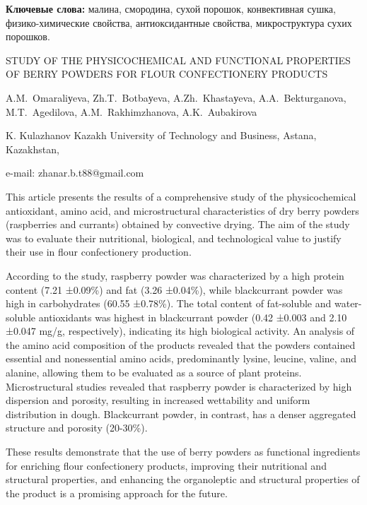 {\bfseries Ключевые слова:} малина, смородина, сухой порошок, конвективная
сушка, физико-химические свойства, антиоксидантные свойства,
микроструктура сухих порошков.
\vspace{1em}
\begin{header}
STUDY OF THE PHYSICOCHEMICAL AND FUNCTIONAL PROPERTIES OF BERRY POWDERS FOR FLOUR CONFECTIONERY PRODUCTS

A.M.~Omaraliуeva,
Zh.T.~Botbaуeva\envelope,
A.Zh.~Khastaуeva,
A.A.~Bekturganova,
M.T.~Agedilova,
A.M.~Rakhimzhanova,
A.K.~Aubakirova
\end{header}

\begin{affil}
K. Kulazhanov Kazakh University of Technology and Business, Astana, Kazakhstan,

e-mail: zhanar.b.t88@gmail.com
\end{affil}

This article presents the results of a comprehensive study of the
physicochemical antioxidant, amino acid, and microstructural
characteristics of dry berry powders (raspberries and currants) obtained
by convective drying. The aim of the study was to evaluate their
nutritional, biological, and technological value to justify their use in
flour confectionery production.

According to the study, raspberry powder was characterized by a high
protein content (7.21 ±0.09\%) and fat (3.26 ±0.04\%), while
blackcurrant powder was high in carbohydrates (60.55 ±0.78\%). The total
content of fat-soluble and water-soluble antioxidants was highest in
blackcurrant powder (0.42 ±0.003 and 2.10 ±0.047 mg/g, respectively),
indicating its high biological activity. An analysis of the amino acid
composition of the products revealed that the powders contained
essential and nonessential amino acids, predominantly lysine, leucine,
valine, and alanine, allowing them to be evaluated as a source of plant
proteins. Microstructural studies revealed that raspberry powder is
characterized by high dispersion and porosity, resulting in increased
wettability and uniform distribution in dough. Blackcurrant powder, in
contrast, has a denser aggregated structure and porosity (20-30\%).

These results demonstrate that the use of berry powders as functional
ingredients for enriching flour confectionery products, improving their
nutritional and structural properties, and enhancing the organoleptic
and structural properties of the product is a promising approach for the
future.

